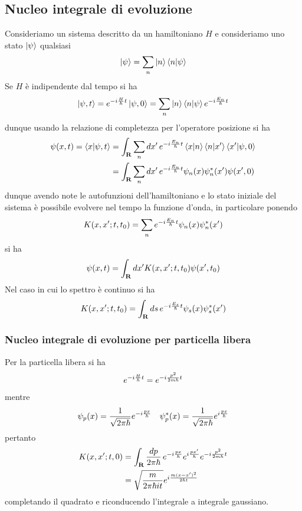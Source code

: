 \documentclass{article}
\begin{document}
\subsection{Nucleo integrale di evoluzione}
Consideriamo un sistema descritto da un hamiltoniano $H$ e consideriamo uno stato $\ket{\psi}$ qualsiasi
\begin{gather}
    \ket{\psi} = \sum_{n}\ket{n}\braket{n|\psi} \notag
\end{gather}
Se $H$ è indipendente dal tempo si ha
\begin{gather}
    \ket{\psi, t} = e^{-i\frac{H}{\hbar}t}\ket{\psi, 0} = \sum_{n} \ket{n}\braket{n|\psi}e^{-i\frac{E_n}{\hbar}t} \notag
\end{gather}
dunque usando la relazione di completezza per l'operatore posizione si ha
\begin{align}
    \psi(x, t) = \braket{x|\psi, t} &= \int_{\mathbf{R}}\sum_n dx' \, e^{-i\frac{E_n}{\hbar}t}\braket{x|n}\braket{n|x'}\braket{x'|\psi, 0} \notag \\
    &= \int_{\mathbf{R}}\sum_n dx' \, e^{-i\frac{E_n}{\hbar}t}\psi_n(x)\psi^*_n(x')\psi(x', 0) \notag
\end{align}
dunque avendo note le autofunzioni dell'hamiltoniano e lo stato iniziale del sistema è possibile evolvere nel tempo la funzione d'onda, in particolare ponendo
\begin{gather}
    K(x, x'; t, t_0) = \sum_n e^{-i\frac{E_n}{\hbar}t}\psi_n(x)\psi^*_n(x') \notag
\end{gather}
si ha
\begin{gather}
    \psi(x, t) = \int_{\mathbf{R}}dx' K(x, x'; t, t_0)\psi(x', t_0) \notag
\end{gather}
Nel caso in cui lo spettro è continuo si ha
\begin{gather}
    K(x, x'; t, t_0) = \int_{\mathbf{R}}ds \, e^{-i\frac{E_s}{\hbar}t}\psi_s(x)\psi^*_s(x') \notag
\end{gather}

\subsubsection{Nucleo integrale di evoluzione per particella libera}
Per la particella libera si ha
\begin{gather}
    e^{-i\frac{H}{\hbar}t} = e^{-i\frac{p^2}{2m\hbar}t} \notag
\end{gather}
mentre
\begin{gather}
    \psi_p(x) = \frac{1}{\sqrt{2\pi\hbar}}e^{-i\frac{px}{\hbar}} \quad \psi^*_p(x) = \frac{1}{\sqrt{2\pi\hbar}}e^{i\frac{px}{\hbar}} \notag
\end{gather}
pertanto
\begin{align}
    K(x, x'; t, 0) &= \int_\mathbf{R}\frac{dp}{2\pi\hbar} \, e^{-i\frac{px}{\hbar}}e^{i\frac{px'}{\hbar}}e^{-i\frac{p^2}{2m\hbar}t} \notag \\
    &= \sqrt{\frac{m}{2\pi\hbar i t}}e^{i\frac{m(x - x')^2}{2\hbar t}} \notag
\end{align}
completando il quadrato e riconducendo l'integrale a integrale gaussiano.
\end{document}

